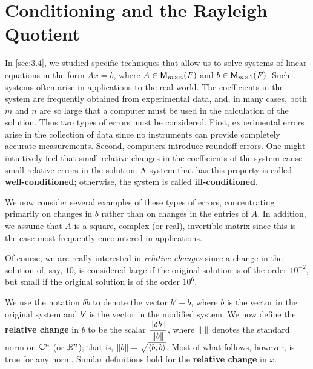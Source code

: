 \section{Conditioning and the Rayleigh Quotient}\label{sec:6.10}

\begin{defn}\label{6.10.1}
  In \cref{sec:3.4}, we studied specific techniques that allow us to solve systems of linear equations in the form \(Ax = b\), where \(A \in \ms\) and \(b \in \ms[m][1][\F]\).
  Such systems often arise in applications to the real world.
  The coefficients in the system are frequently obtained from experimental data, and, in many cases, both \(m\) and \(n\) are so large that a computer must be used in the calculation of the solution.
  Thus two types of errors must be considered.
  First, experimental errors arise in the collection of data since no instruments can provide completely accurate measurements.
  Second, computers introduce roundoff errors.
  One might intuitively feel that small relative changes in the coefficients of the system cause small relative errors in the solution.
  A system that has this property is called \textbf{well-conditioned};
  otherwise, the system is called \textbf{ill-conditioned}.
\end{defn}

\begin{note}
  We now consider several examples of these types of errors, concentrating primarily on changes in \(b\) rather than on changes in the entries of \(A\).
  In addition, we assume that \(A\) is a square, complex (or real), invertible matrix since this is the case most frequently encountered in applications.

  Of course, we are really interested in \emph{relative changes} since a change in the solution of, say, \(10\), is considered large if the original solution is of the order \(10^{-2}\), but small if the original solution is of the order \(10^6\).
\end{note}

\begin{defn}\label{6.10.2}
  We use the notation \(\delta b\) to denote the vector \(b' - b\), where \(b\) is the vector in the original system and \(b'\) is the vector in the modified system.
  We now define the \textbf{relative change} in \(b\) to be the scalar \(\dfrac{\left\lVert\delta b\right\rVert}{\left\lVert b\right\rVert}\), where \(\left\lVert\cdot\right\rVert\) denotes the standard norm on \(\mathbb{C}^n\) (or \(\mathbb{R}^n\));
  that is, \(\left\lVert b\right\rVert = \sqrt{\left\langle b, b\right\rangle}\).
  Most of what follows, however, is true for any norm.
  Similar definitions hold for the \textbf{relative change} in \(x\).
\end{defn}

